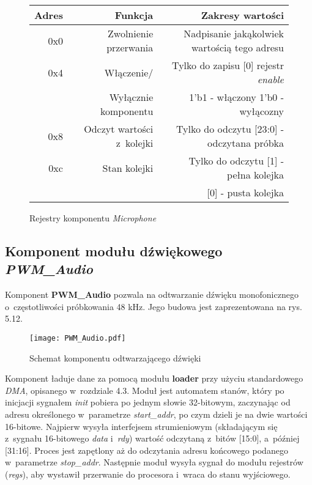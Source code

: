 \begin{figure}[h]
	\centering
	\begin{tabular}{|r|r|r|}
		\hline
		Adres & Funkcja & Zakresy wartości\\
		\hline
		0x0 & Zwolnienie przerwania & Nadpisanie jakąkolwiek wartością tego adresu\\
		\hline 
		0x4 & Włączenie/ & Tylko do zapisu [0] rejestr \textit{enable} \\
			& Wyłącznie komponentu		 & 1'b1 - włączony 1'b0 - wyłącozny \\
		\hline
		0x8 & Odczyt wartości z~kolejki		 & Tylko do odczytu [23:0] - odczytana próbka\\
		\hline
		0xc & Stan kolejki					& Tylko do odczytu [1] - pełna kolejka\\
			&								& [0] - pusta kolejka\\

		\hline 
	\end{tabular}
	
	\caption{Rejestry komponentu \textit{Microphone}}
\end{figure}
\FloatBarrier %

\subsection{Komponent modułu dźwiękowego \textit{PWM\_Audio}}
Komponent \textbf{PWM\_Audio} pozwala na odtwarzanie dźwięku monofonicznego o~częstotliwości próbkowania 48 kHz. Jego budowa jest zaprezentowana na rys. 5.12.

\begin{figure}[h]
	\centering
	\texttt{[image: PWM\_Audio.pdf]}
	\caption{Schemat komponentu odtwarzającego dźwięki}
\end{figure}
\FloatBarrier %

Komponent ładuje dane za pomocą modułu \textbf{loader} przy użyciu standardowego \textit{DMA}, opisanego w~rozdziale 4.3. Moduł jest automatem stanów, który po inicjacji sygnałem \textit{init} pobiera po jednym słowie 32-bitowym, zaczynając od adresu określonego w~parametrze \textit{start\_addr}, po czym dzieli je na dwie wartości 16-bitowe. Najpierw wysyła interfejsem strumieniowym (składającym się z~sygnału 16-bitowego \textit{data} i~\textit{rdy}) wartość odczytaną z~bitów [15:0], a~później [31:16]. Proces jest zapętlony aż do odczytania adresu końcowego podanego w~parametrze \textit{stop\_addr}. Następnie moduł wysyła sygnał do modułu rejestrów (\textit{regs}), aby wystawił przerwanie do procesora i~wraca do stanu wyjściowego.

